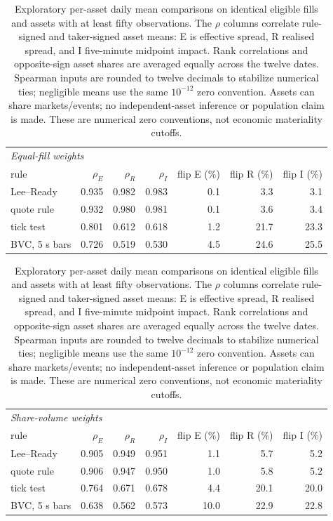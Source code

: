 \begin{table}[htbp]
\centering\footnotesize
\begin{tabular}{lrrrrrr}
\toprule
\multicolumn{7}{l}{\emph{Equal-fill weights}} \\
rule & $\rho_E$ & $\rho_R$ & $\rho_I$ & flip E (\%) & flip R (\%) & flip I (\%) \\
\midrule
Lee--Ready & 0.935 & 0.982 & 0.983 & 0.1 & 3.3 & 3.1 \\
quote rule & 0.932 & 0.980 & 0.981 & 0.1 & 3.6 & 3.4 \\
tick test & 0.801 & 0.612 & 0.618 & 1.2 & 21.7 & 23.3 \\
BVC, 5 s bars & 0.726 & 0.519 & 0.530 & 4.5 & 24.6 & 25.5 \\
\bottomrule
\end{tabular}
\par\medskip
\begin{tabular}{lrrrrrr}
\toprule
\multicolumn{7}{l}{\emph{Share-volume weights}} \\
rule & $\rho_E$ & $\rho_R$ & $\rho_I$ & flip E (\%) & flip R (\%) & flip I (\%) \\
\midrule
Lee--Ready & 0.905 & 0.949 & 0.951 & 1.1 & 5.7 & 5.2 \\
quote rule & 0.906 & 0.947 & 0.950 & 1.0 & 5.8 & 5.2 \\
tick test & 0.764 & 0.671 & 0.678 & 4.4 & 20.1 & 20.0 \\
BVC, 5 s bars & 0.638 & 0.562 & 0.573 & 10.0 & 22.9 & 22.8 \\
\bottomrule
\end{tabular}
\caption{Exploratory per-asset daily mean comparisons on identical eligible fills and assets with at least fifty observations. The $\rho$ columns correlate rule-signed and taker-signed asset means: E is effective spread, R realised spread, and I five-minute midpoint impact. Rank correlations and opposite-sign asset shares are averaged equally across the twelve dates. Spearman inputs are rounded to twelve decimals to stabilize numerical ties; negligible means use the same $10^{-12}$ zero convention. Assets can share markets/events; no independent-asset inference or population claim is made. These are numerical zero conventions, not economic materiality cutoffs.}
\label{tab:cached-economic-ranks}
\end{table}
